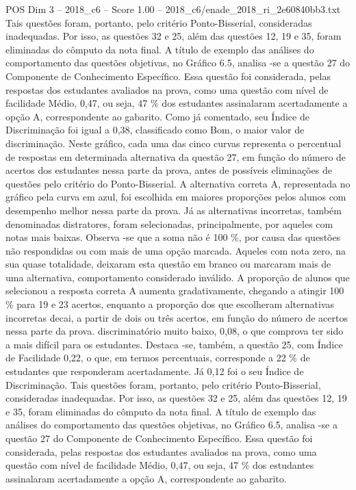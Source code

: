 \begin{textsample}{POS Dim 3 – 2018\_c6 – Score 1.00 – 2018\_c6/enade\_2018\_ri\_2e60840bb3.txt}
Tais questões foram, portanto, pelo critério Ponto-Bisserial, consideradas inadequadas.
Por isso, as questões 32 e 25, além das questões 12, 19 e 35, foram eliminadas do cômputo da nota final.
A título de exemplo das análises do comportamento das questões objetivas, no Gráfico 6.5, analisa -se a questão 27 do Componente de Conhecimento Específico.
Essa questão foi considerada, pelas respostas dos estudantes avaliados na prova, como uma questão com nível de facilidade Médio, 0,47, ou seja, 47 \% dos estudantes assinalaram acertadamente a opção A, correspondente ao gabarito.
Como já comentado, seu Índice de Discriminação foi igual a 0,38, classificado como Bom, o maior valor de discriminação.
Neste gráfico, cada uma das cinco curvas representa o percentual de respostas em determinada alternativa da questão 27, em função do número de acertos dos estudantes nessa parte da prova, antes de possíveis eliminações de questões pelo critério do Ponto-Bisserial.
A alternativa correta A, representada no gráfico pela curva em azul, foi escolhida em maiores proporções pelos alunos com desempenho melhor nessa parte da prova.
Já as alternativas incorretas, também denominadas distratores, foram selecionadas, principalmente, por aqueles com notas mais baixas.
Observa -se que a soma não é 100 \%, por causa das questões não respondidas ou com mais de uma opção marcada.
Aqueles com nota zero, na sua quase totalidade, deixaram esta questão em branco ou marcaram mais de uma alternativa, comportamento considerado inválido.
A proporção de alunos que selecionou a resposta correta A aumenta gradativamente, chegando a atingir 100 \% para 19 e 23 acertos, enquanto a proporção dos que escolheram alternativas incorretas decai, a partir de dois ou três acertos, em função do número de acertos nessa parte da prova. discriminatório muito baixo, 0,08, o que comprova ter sido a mais difícil para os estudantes.
Destaca -se, também, a questão 25, com Índice de Facilidade 0,22, o que, em termos percentuais, corresponde a 22 \% de estudantes que responderam acertadamente.
Já 0,12 foi o seu Índice de Discriminação.
Tais questões foram, portanto, pelo critério Ponto-Bisserial, consideradas inadequadas.
Por isso, as questões 32 e 25, além das questões 12, 19 e 35, foram eliminadas do cômputo da nota final.
A título de exemplo das análises do comportamento das questões objetivas, no Gráfico 6.5, analisa -se a questão 27 do Componente de Conhecimento Específico.
Essa questão foi considerada, pelas respostas dos estudantes avaliados na prova, como uma questão com nível de facilidade Médio, 0,47, ou seja, 47 \% dos estudantes assinalaram acertadamente a opção A, correspondente ao gabarito.

\end{textsample}
